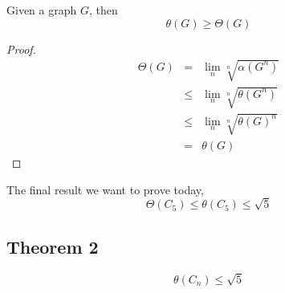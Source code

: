 \documentclass{beamer}
\begin{document}
                  \begin{frame}
                        \begin{theorem}
                              Given a graph $ G $, then
                              \begin{equation}
                                    \theta(G) \geq \Theta(G)
                              \end{equation}
                        \end{theorem}

                        \pause

                        \begin{proof}
                              \begin{eqnarray}
                                    \Theta(G) &=& \lim_{n} \sqrt[n]{\alpha(G^{n})} \\
                                    &\leq& \lim_{n} \sqrt[n]{\theta(G^{n})} \\
                                    &\leq& \lim_{n} \sqrt[n]{\theta(G)^{n}} \\
                                    &=& \theta(G)
                              \end{eqnarray}
                        \end{proof}
                  \end{frame}

                  \begin{frame}
                        The final result we want to prove today,
                        \begin{equation}
                              \Theta(C_{5}) \le \theta(C_{5}) \le \sqrt{5}
                        \end{equation}
                  \end{frame}

            \subsection{Theorem 2}

                  \begin{frame}
                        \begin{theorem}
                              \begin{equation}
                                    \theta(C_{n}) \leq \sqrt{5}
                              \end{equation}
                        \end{theorem}
                  \end{frame}
\end{document}
